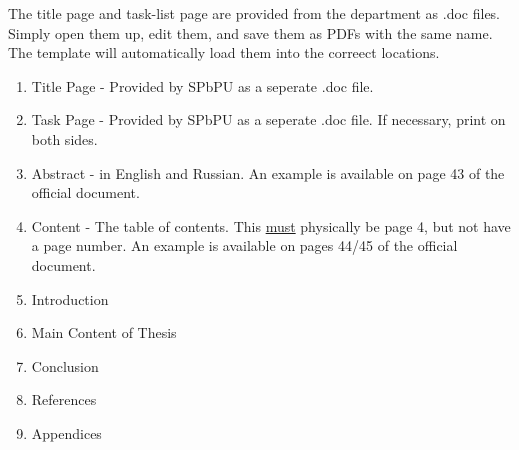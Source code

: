 \label{sec:guidelines_content}
The title page and task-list page are provided from the department as .doc files. Simply open them up, edit them, and save them as PDFs with the same name. The template will automatically load them into the correect locations.

\begin{enumerate}
    \item Title Page - Provided by SPbPU as a seperate .doc file.
    \item Task Page - Provided by SPbPU as a seperate .doc file. If necessary, print on both sides.
    \item Abstract - in English and Russian. An example is available on page 43 of the official document.\cite{Polytech2018}
    \item Content - The table of contents. This \underline{must} physically be page 4, but not have a page number. An example is available on pages 44/45 of the official document.\cite{Polytech2018}
    \item Introduction
    \item Main Content of Thesis
    \item Conclusion
    \item References
    \item Appendices
\end{enumerate}
